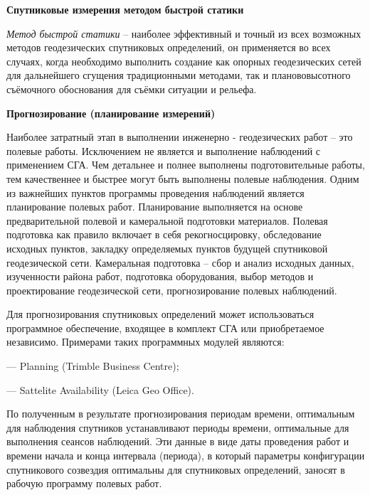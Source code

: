 \documentclass[a4paper]{article}
\begin{document}
\begin{newpage}

    \large{
        \begin{center}
            \textbf{Спутниковые измерения методом быстрой статики}
        \end{center}
        
        \par\textit{Метод быстрой статики} – наиболее эффективный и точный из всех возможных методов геодезических спутниковых определений, он применяется во всех случаях, когда необходимо выполнить создание как опорных геодезических сетей для дальнейшего сгущения традиционными методами, так и планововысотного съёмочного обоснования для съёмки ситуации и рельефа.\\
        \par\textbf{Прогнозирование (планирование измерений)}
        \par Наиболее затратный этап в выполнении инженерно - геодезических работ – это полевые работы. Исключением не является и выполнение наблюдений с применением СГА. Чем детальнее и полнее выполнены подготовительные работы, тем качественнее и быстрее могут быть выполнены полевые наблюдения. Одним из важнейших пунктов программы проведения наблюдений является планирование полевых работ. Планирование выполняется на основе предварительной полевой и камеральной подготовки материалов. Полевая подготовка как правило включает в себя рекогносцировку, обследование исходных пунктов, закладку определяемых пунктов будущей спутниковой геодезической сети. Камеральная подготовка – сбор и анализ исходных данных, изученности района работ, подготовка оборудования, выбор методов и проектирование геодезической сети, прогнозирование полевых наблюдений.
        \par Для прогнозирования спутниковых определений может использоваться программное обеспечение, входящее в комплект СГА или приобретаемое независимо. Примерами таких программных модулей являются:\\
        \par — Planning (Trimble Business Centre);
        \par — Sattelite Availability (Leica Geo Office).
        \par По полученным в результате прогнозирования периодам времени, оптимальным для наблюдения спутников устанавливают периоды времени, оптимальные для выполнения сеансов наблюдений. Эти данные в виде даты проведения работ и времени начала и конца интервала (периода), в который параметры конфигурации спутникового созвездия оптимальны для спутниковых определений, заносят в рабочую программу полевых работ.\\
}
\end{newpage}
\end{document}
